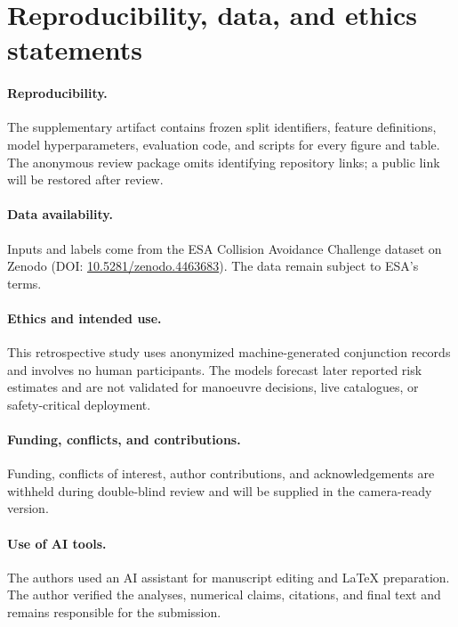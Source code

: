 \documentclass{article}
\begin{document}
\section{Reproducibility, data, and ethics statements}

\paragraph{Reproducibility.} The supplementary artifact contains frozen split identifiers, feature definitions, model hyperparameters, evaluation code, and scripts for every figure and table. The anonymous review package omits identifying repository links; a public link will be restored after review.

\paragraph{Data availability.} Inputs and labels come from the ESA Collision Avoidance Challenge dataset on Zenodo (DOI: \href{https://doi.org/10.5281/zenodo.4463683}{10.5281/zenodo.4463683}). The data remain subject to ESA's terms.

\paragraph{Ethics and intended use.} This retrospective study uses anonymized machine-generated conjunction records and involves no human participants. The models forecast later reported risk estimates and are not validated for manoeuvre decisions, live catalogues, or safety-critical deployment.

\paragraph{Funding, conflicts, and contributions.} Funding, conflicts of interest, author contributions, and acknowledgements are withheld during double-blind review and will be supplied in the camera-ready version.

\paragraph{Use of AI tools.} The authors used an AI assistant for manuscript editing and LaTeX preparation. The author verified the analyses, numerical claims, citations, and final text and remains responsible for the submission.
\end{document}
